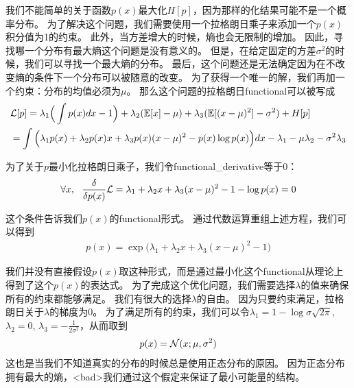 我们不能简单的关于函数$p(x)$最大化$H[p]$，因为那样的化结果可能不是一个概率分布。
为了解决这个问题，我们需要使用一个拉格朗日乘子来添加一个$p(x)$积分值为1的约束。
此外，当方差增大的时候，熵也会无限制的增加。
因此，寻找哪一个分布有最大熵这个问题是没有意义的。
但是，在给定固定的方差$\sigma^2$的时候，我们可以寻找一个最大熵的分布。
最后，这个问题还是无法确定因为在不改变熵的条件下一个分布可以被随意的改变。
为了获得一个唯一的解，我们再加一个约束：分布的均值必须为$\mu$。
那么这个问题的拉格朗日\gls{functional}可以被写成
\begin{align}
\label{eqn:1950}
&		\mathcal{L}[p] =  \lambda_1 \Big(\int p(x)dx - 1\Big)  + \lambda_2 (\mathbb{E}[x] - \mu) +  \lambda_3 (\mathbb{E}[(x-\mu)^2] - \sigma^2)  + H[p]\\
& =  \int \Big(\lambda_1 p(x) + \lambda_2 p(x)x + \lambda_3 p(x)(x-\mu)^2 - p(x)\log p(x) \Big)dx - \lambda_1 - \mu \lambda_2 - \sigma^2\lambda_3
\end{align}


为了关于$p$最小化拉格朗日乘子，我们令\gls{functional_derivative}等于0：
\begin{align}
\label{eqn:1952}
	\forall x,\ \  \frac{\delta}{\delta p(x)} \mathcal{L} = \lambda_1 + \lambda_2 x + \lambda_3(x-\mu)^2 - 1 - \log p(x) = 0 
\end{align}


这个条件告诉我们$p(x)$的\gls{functional}形式。
通过代数运算重组上述方程，我们可以得到
\begin{align}
\label{eqn:1953}
	p(x) = \exp\big(\lambda_1 + \lambda_2 x + \lambda_3 (x-\mu)^2  - 1\big)
\end{align}

我们并没有直接假设$p(x)$取这种形式，而是通过最小化这个\gls{functional}从理论上得到了这个$p(x)$的表达式。
为了完成这个优化问题，我们需要选择$\lambda$的值来确保所有的约束都能够满足。
我们有很大的选择$\lambda$的自由。
因为只要约束满足，拉格朗日关于$\lambda$的梯度为0。
为了满足所有的约束，我们可以令$\lambda_1 = 1 - \log \sigma\sqrt{2\pi}$,$\lambda_2 = 0$, $\lambda_3 = - \frac{1}{2\sigma^2}$，从而取到
\begin{align}
\label{eqn:1954}
	p(x) = \mathcal{N}(x;\mu,\sigma^2)
\end{align}
这也是当我们不知道真实的分布的时候总是使用正态分布的原因。
因为正态分布拥有最大的熵，<bad>我们通过这个假定来保证了最小可能量的结构。



